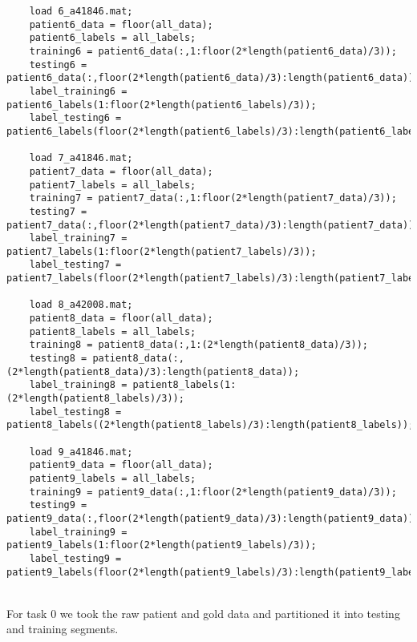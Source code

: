 \documentclass{article}
\begin{document}
\begin{lstlisting}
    load 6_a41846.mat;
    patient6_data = floor(all_data);
    patient6_labels = all_labels;
    training6 = patient6_data(:,1:floor(2*length(patient6_data)/3));
    testing6 = patient6_data(:,floor(2*length(patient6_data)/3):length(patient6_data));
    label_training6 = patient6_labels(1:floor(2*length(patient6_labels)/3));
    label_testing6 = patient6_labels(floor(2*length(patient6_labels)/3):length(patient6_labels));

    load 7_a41846.mat;
    patient7_data = floor(all_data);
    patient7_labels = all_labels;
    training7 = patient7_data(:,1:floor(2*length(patient7_data)/3));
    testing7 = patient7_data(:,floor(2*length(patient7_data)/3):length(patient7_data));
    label_training7 = patient7_labels(1:floor(2*length(patient7_labels)/3));
    label_testing7 = patient7_labels(floor(2*length(patient7_labels)/3):length(patient7_labels));

    load 8_a42008.mat;
    patient8_data = floor(all_data);
    patient8_labels = all_labels;
    training8 = patient8_data(:,1:(2*length(patient8_data)/3));
    testing8 = patient8_data(:,(2*length(patient8_data)/3):length(patient8_data));
    label_training8 = patient8_labels(1:(2*length(patient8_labels)/3));
    label_testing8 = patient8_labels((2*length(patient8_labels)/3):length(patient8_labels));

    load 9_a41846.mat;
    patient9_data = floor(all_data);
    patient9_labels = all_labels;
    training9 = patient9_data(:,1:floor(2*length(patient9_data)/3));
    testing9 = patient9_data(:,floor(2*length(patient9_data)/3):length(patient9_data));
    label_training9 = patient9_labels(1:floor(2*length(patient9_labels)/3));
    label_testing9 = patient9_labels(floor(2*length(patient9_labels)/3):length(patient9_labels));
\end{lstlisting}
\\ For task 0 we took the raw patient and gold data and partitioned it into testing and training segments.
\end{document}
